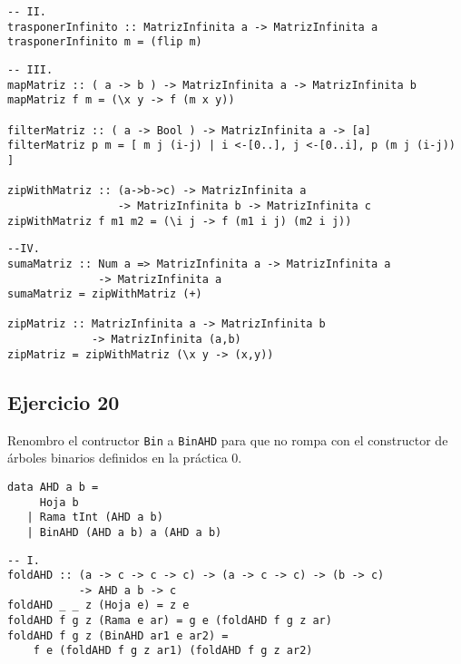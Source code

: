 \documentclass[10pt,a4paper]{article}
\begin{document}
\begin{centrado}
    \begin{verbatim}
-- II.
trasponerInfinito :: MatrizInfinita a -> MatrizInfinita a
trasponerInfinito m = (flip m)
    \end{verbatim}
\end{centrado}


\begin{centrado}
    \begin{verbatim}
-- III.
mapMatriz :: ( a -> b ) -> MatrizInfinita a -> MatrizInfinita b
mapMatriz f m = (\x y -> f (m x y))

filterMatriz :: ( a -> Bool ) -> MatrizInfinita a -> [a]
filterMatriz p m = [ m j (i-j) | i <-[0..], j <-[0..i], p (m j (i-j)) ]

zipWithMatriz :: (a->b->c) -> MatrizInfinita a 
                 -> MatrizInfinita b -> MatrizInfinita c
zipWithMatriz f m1 m2 = (\i j -> f (m1 i j) (m2 i j))
    \end{verbatim}
\end{centrado}

\begin{centrado}
    \begin{verbatim}
--IV.
sumaMatriz :: Num a => MatrizInfinita a -> MatrizInfinita a 
              -> MatrizInfinita a
sumaMatriz = zipWithMatriz (+)

zipMatriz :: MatrizInfinita a -> MatrizInfinita b 
             -> MatrizInfinita (a,b)
zipMatriz = zipWithMatriz (\x y -> (x,y))
    \end{verbatim}
\end{centrado}

\subsection{Ejercicio 20}
Renombro el contructor \texttt{Bin} a \texttt{BinAHD} para que no rompa con el constructor de árboles binarios definidos en la práctica 0.
\begin{centrado}
    \begin{verbatim}
data AHD a b = 
     Hoja b 
   | Rama tInt (AHD a b)
   | BinAHD (AHD a b) a (AHD a b)
    \end{verbatim}
\end{centrado}

\begin{centrado}
    \begin{verbatim}
-- I.
foldAHD :: (a -> c -> c -> c) -> (a -> c -> c) -> (b -> c) 
           -> AHD a b -> c
foldAHD _ _ z (Hoja e) = z e
foldAHD f g z (Rama e ar) = g e (foldAHD f g z ar)
foldAHD f g z (BinAHD ar1 e ar2) =
    f e (foldAHD f g z ar1) (foldAHD f g z ar2)
    \end{verbatim}
\end{centrado}
\end{document}
